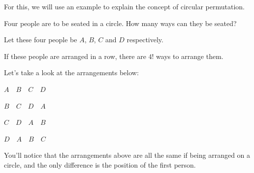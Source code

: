 \documentclass{report}
\begin{document}
\begin{multicols}{2}
  For this, we will use an example to explain the concept of circular
  permutation.

  Four people are to be seated in a circle. How many ways can they be seated?
  \sol{}

  Let these four people be $A$, $B$, $C$ and $D$ respectively.

  If these people are arranged in a row, there are $4!$ ways to arrange them.

  Let's take a look at the arrangements below:
  \begin{center}
    $A \quad B \quad C \quad D$

    $B \quad C \quad D \quad A$

    $C \quad D \quad A \quad B$

    $D \quad A \quad B \quad C$
  \end{center}
  You'll notice that the arrangements above are all the same if being arranged on
  a circle, and the only difference is the position of the first person.
  \begin{center}
    \hspace{1cm}
  \end{center}
  \begin{center}
    \hspace{1cm}
  \end{center}


\end{multicols}
\end{document}

